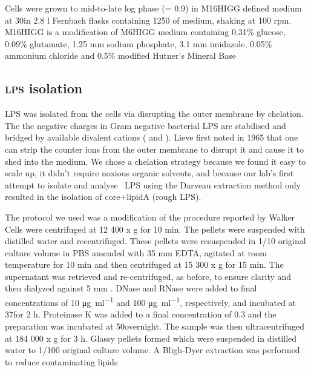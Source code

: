 		Cells were grown to mid-to-late log phase (\od = 0.9) in M16HIGG defined medium at 30\cel in 2.8 \si{\litre} Fernbach flasks containing 1250 \millilitre of medium, shaking at 100 rpm. M16HIGG is a modification of M6HIGG medium containing 0.31\% glucose, 0.09\% glutamate, 1.25 \si{\milli\meter} sodium phosphate, 3.1 \si{\milli\meter} imidazole, 0.05\% ammonium chloride and 0.5\% modified Hutner's Mineral Base 

	\subsection{\textsc{lps} isolation} %
	\label{sub:LPS_isolation}

		\ac{LPS} was isolated from the cells via disrupting the outer membrane by chelation.
		 The the negative charges in Gram negative bacterial \ac{LPS} are stabilised and bridged by available divalent cations (\ie{}  and ). Lieve %
		 first noted in 1965 %
		 that one can strip the counter ions from the outer membrane to disrupt it and cause it to shed into the medium. We chose a chelation strategy because we found it easy to scale up, it didn't require noxious organic solvents, and because our lab's first attempt to isolate and analyse \caulobacter\ \ac{LPS} using the Darveau extraction method %
		 only resulted in the isolation of core+lipidA (rough \ac{LPS}).

		 The protocol we used was a modification of the procedure reported by Walker \etal\! Cells were centrifuged at 12 400 x g for 10 min. The pellets were suspended with distilled water and recentrifuged. These pellets were resuspended in 1/10 original culture volume in \ac{PBS} amended with 35 \si{\milli\meter} \ac{EDTA}, agitated at room temperature for 10 min and then centrifuged at 15 300 x g for 15 min. The supernatant was retrieved and re-centrifuged, as before, to ensure clarity and then dialyzed against 5 \si{\milli\meter} . DNase and RNase were added to final concentrations of 10 \si{\micro\gram\per\milli\litre} and 100 \si{\micro\gram\per\milli\litre}\!, respectively, and incubated at 37\cel for 2 h. Proteinase K was added to a final concentration of 0.3 \mgperml and the preparation was incubated at 50\cel overnight. The sample was then ultracentrifuged at 184 000 x g for 3 h. Glassy pellets formed which were suspended in distilled water to 1/100 original culture volume. A Bligh-Dyer extraction was performed to reduce contaminating lipids

